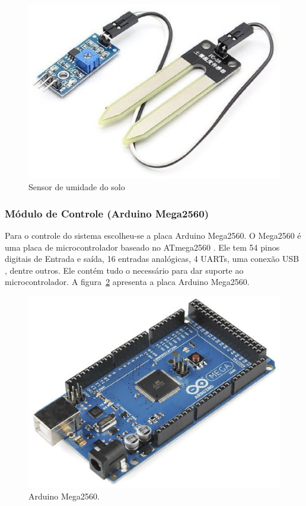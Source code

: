   \begin{figure}[!htbp]
  \begin{center}
  \includegraphics[keepaspectratio=true,scale=0.3]{figuras/higrometer.eps}
  \caption{\label{DHT11}Sensor de umidade do solo}
  \end{center}
  \end{figure}

  \subsubsection{Módulo de Controle (Arduino Mega2560)}

  Para o controle do sistema escolheu-se a placa Arduino Mega2560.
  O Mega2560 é uma placa de microcontrolador baseado no ATmega2560 .
  Ele tem 54 pinos digitais de Entrada e saída, 16 entradas analógicas,
  4 UARTs, uma conexão USB , dentre outros. Ele contém tudo o necessário
  para dar suporte ao microcontrolador. A figura~\ref{fig:arduino} apresenta a placa
  Arduino Mega2560.

  \begin{figure}[!htbp]
  \begin{center}
  \includegraphics[width=.6\textwidth]{figuras/arduino.eps}
  \caption{\label{fig:arduino}Arduino Mega2560.}
  \end{center}
  \end{figure}

